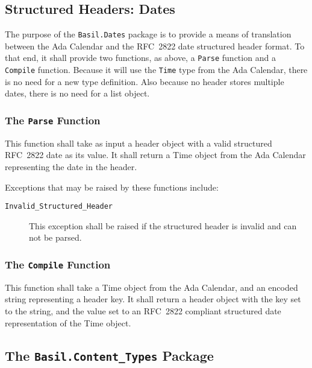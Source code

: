 \documentclass[11pt]{article}
\begin{document}
\subsection{Structured Headers: Dates}

The purpose of the \texttt{Basil.Dates} package is to provide a means
of translation between the Ada Calendar and the RFC~2822 date
structured header format. To that end, it shall provide two functions,
as above, a \texttt{Parse} function and a \texttt{Compile}
function. Because it will use the \texttt{Time} type from the Ada
Calendar, there is no need for a new type definition. Also because no
header stores multiple dates, there is no need for a list object.

\subsubsection{The \texttt{Parse} Function}

This function shall take as input a header object with a valid
structured RFC~2822 date as its value. It shall return a Time object
from the Ada Calendar representing the date in the header.

Exceptions that may be raised by these functions include:

\begin{description}

\item[\texttt{Invalid\_Structured\_Header}] This exception shall be
  raised if the structured header is invalid and can not be parsed.

\end{description}

\subsubsection{The \texttt{Compile} Function}

This function shall take a Time object from the Ada Calendar, and an
encoded string representing a header key. It shall return a header
object with the key set to the string, and the value set to an
RFC~2822 compliant structured date representation of the Time object.



\subsection{The \texttt{Basil.Content\_Types} Package}
\end{document}
